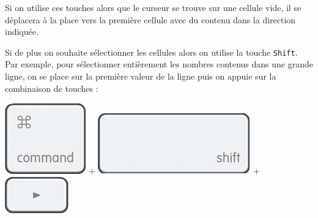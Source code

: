 Si on utilise ces touches alors que le curseur se trouve sur une cellule vide, il se déplacera à la place vers la première cellule avec du contenu dans la direction indiquée.

Si de plus on souhaite sélectionner les cellules alors on utilise la touche \texttt{Shift}. Par exemple, pour sélectionner entièrement les nombres contenus dans une grande ligne, on se place sur la première valeur de la ligne puis on appuie sur la combinaison de touches :

\begin{center}
	\includegraphics[scale=1.5]{./images/tableur03/clavierCmd}  + \includegraphics[scale=1.5]{./images/tableur03/clavierShift} + \includegraphics[scale=1.5]{./images/tableur03/clavierRight}
\end{center}